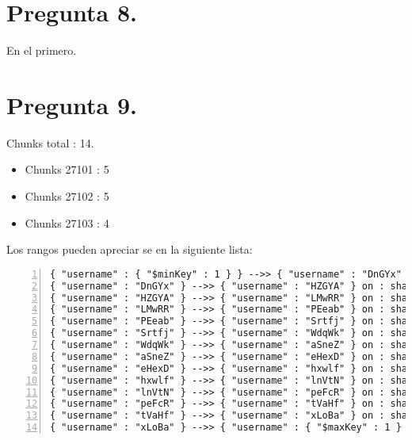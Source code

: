 \documentclass{article}
\begin{document}
  \section{Pregunta 8.}
    En el primero.

  \section{Pregunta 9.}
  Chunks total : 14.
  \begin{itemize}
    \item Chunks 27101 : 5
    \item Chunks 27102 : 5
    \item Chunks 27103 : 4
  \end{itemize}
  Los rangos pueden apreciar se en la siguiente lista:
  \begin{lstlisting}[numbers=left, basicstyle=\tiny]
{ "username" : { "$minKey" : 1 } } -->> { "username" : "DnGYx" } on : shard0001 Timestamp(2, 0) 
{ "username" : "DnGYx" } -->> { "username" : "HZGYA" } on : shard0002 Timestamp(3, 0) 
{ "username" : "HZGYA" } -->> { "username" : "LMwRR" } on : shard0001 Timestamp(4, 0) 
{ "username" : "LMwRR" } -->> { "username" : "PEeab" } on : shard0002 Timestamp(5, 0) 
{ "username" : "PEeab" } -->> { "username" : "Srtfj" } on : shard0001 Timestamp(6, 0) 
{ "username" : "Srtfj" } -->> { "username" : "WdqWk" } on : shard0002 Timestamp(7, 0) 
{ "username" : "WdqWk" } -->> { "username" : "aSneZ" } on : shard0001 Timestamp(8, 0) 
{ "username" : "aSneZ" } -->> { "username" : "eHexD" } on : shard0002 Timestamp(9, 0) 
{ "username" : "eHexD" } -->> { "username" : "hxwlf" } on : shard0001 Timestamp(10, 0) 
{ "username" : "hxwlf" } -->> { "username" : "lnVtN" } on : shard0000 Timestamp(10, 1) 
{ "username" : "lnVtN" } -->> { "username" : "peFcR" } on : shard0000 Timestamp(1, 10) 
{ "username" : "peFcR" } -->> { "username" : "tVaHf" } on : shard0000 Timestamp(1, 11) 
{ "username" : "tVaHf" } -->> { "username" : "xLoBa" } on : shard0000 Timestamp(1, 12) 
{ "username" : "xLoBa" } -->> { "username" : { "$maxKey" : 1 } } on : shard0000 Timestamp(1, 13) 
  \end{lstlisting}


  \newpage
\end{document}
